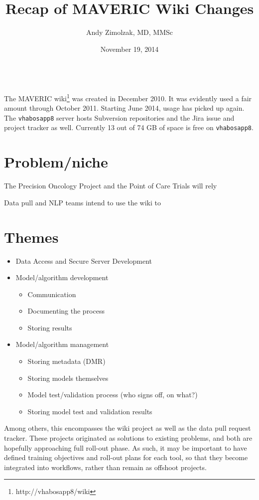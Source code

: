 \documentclass{tufte-handout}
\title{Recap of MAVERIC Wiki Changes}
\author{Andy Zimolzak, MD, MMSc}
\date{November 19, 2014}
\begin{document}
\maketitle

~\\

The MAVERIC wiki\footnote{http://vhabosapp8/wiki} was created in December
2010. It was evidently used a fair amount through October 2011.
Starting June 2014, usage has picked up again. The \texttt{vhabosapp8} server
hosts Subversion repositories and the Jira issue and project tracker
as well. Currently 13 out of 74 GB of space is free on
\texttt{vhabosapp8}.

\section{Problem/niche}

The Precision Oncology Project and the Point of Care Trials will rely 

Data pull and NLP teams intend to use the wiki to 

\section{Themes}

\begin{itemize}
\item Data Access and Secure Server Development
\item Model/algorithm development

\begin{itemize}
\item Communication
\item Documenting the process
\item Storing results
\end{itemize}

\item Model/algorithm management

\begin{itemize}
\item Storing metadata (DMR)
\item Storing models themselves
\item Model test/validation process (who signs off, on what?)
\item Storing model test and validation results
\end{itemize}
\end{itemize}

Among others, this encompasses the wiki project as well as the data
pull request tracker. These projects originated as solutions to
existing problems, and both are hopefully approaching full roll-out
phase. As such, it may be important to have defined training
objectives and roll-out plans for each tool, so that they become
integrated into workflows, rather than remain as offshoot projects.
 
\end{document}
